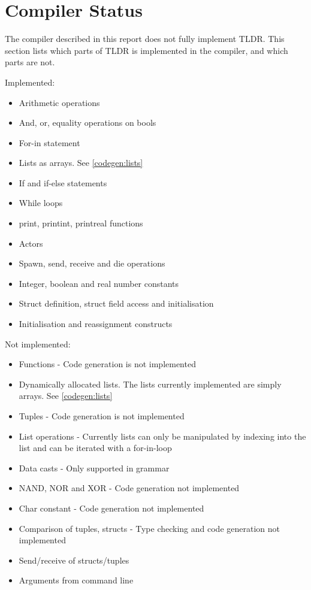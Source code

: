 \section{Compiler Status}\label{sec:compilerStatus}

The compiler described in this report does not fully implement TLDR. This section lists which parts of TLDR is implemented in the compiler, and which parts are not.


Implemented:

\begin{itemize}
\item Arithmetic operations
\item And, or, equality operations on bools
\item For-in statement
\item Lists as arrays. See \cref{codegen:lists}
\item If and if-else statements
\item While loops
\item print, printint, printreal functions
\item Actors
\item Spawn, send, receive and die operations
\item Integer, boolean and real number constants
\item Struct definition, struct field access and initialisation
\item Initialisation and reassignment constructs
\end{itemize}

Not implemented:

\begin{itemize}
\item Functions - Code generation is not implemented
\item Dynamically allocated lists. The lists currently implemented are simply arrays. See \cref{codegen:lists}
\item Tuples - Code generation is not implemented
\item List operations - Currently lists can only be manipulated by indexing into the list and can be iterated with a for-in-loop
\item Data casts - Only supported in grammar
\item NAND, NOR and XOR - Code generation not implemented
\item Char constant - Code generation not implemented
\item Comparison of tuples, structs - Type checking and code generation not implemented
\item Send/receive of structs/tuples
\item Arguments from command line
\end{itemize}
